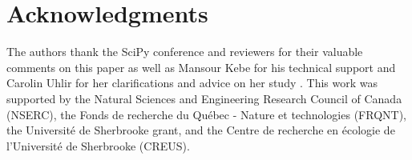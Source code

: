 \section{Acknowledgments}\label{acknowledgments}

The authors thank the SciPy conference and reviewers for their valuable comments on this paper as well as Mansour Kebe for his technical support and Carolin Uhlir for her clarifications and advice on her study \citep{uhlir_adding_2021}. This work was supported by the Natural Sciences and Engineering Research Council of Canada (NSERC), the Fonds de recherche du Québec - Nature et technologies (FRQNT), the Université de Sherbrooke grant, and the Centre de recherche en écologie de l’Université de Sherbrooke (CREUS).
